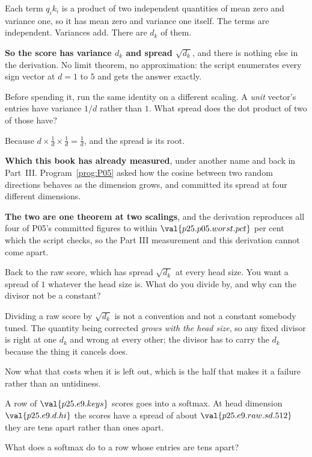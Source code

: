 \begin{fr}

Each term $q_i k_i$ is a product of two independent quantities of mean zero
and variance one, so it has mean zero and variance one itself. The terms are
independent. Variances add. There are $d_k$ of them.

\textbf{So the score has variance $d_k$ and spread $\sqrt{d_k}$}, and there is
nothing else in the derivation. No limit theorem, no approximation: the script
enumerates every sign vector at $d = 1$ to $5$ and gets the answer exactly.

Before spending it, run the same identity on a different scaling. A
\emph{unit} vector's entries have variance $1/d$ rather than $1$. What spread
does the dot product of two of those have?
\dotline
\nextframe
\end{fr}

\begin{fr}

Because $d \times \frac{1}{d} \times \frac{1}{d} = \frac{1}{d}$, and the
spread is its root.

\textbf{Which this book has already measured}, under another name and back in
Part~III. Program~\ref{prog:P05} asked how the cosine between two random
directions behaves as the dimension grows, and committed its spread at four
different dimensions.

\textbf{The two are one theorem at two scalings}, and the derivation
reproduces all four of P05's committed figures to within
$\val{p25.p05.worst.pct}$ per cent \dash{} which the script checks, so the
Part III measurement and this derivation cannot come apart.

Back to the raw score, which has spread $\sqrt{d_k}$ at every head size. You
want a spread of $1$ whatever the head size is. What do you divide by, and why
can the divisor not be a constant?
\dotline
\nextframe
\end{fr}

\begin{fr}

Dividing a raw score by $\sqrt{d_k}$ is not a convention and not a constant
somebody tuned. The quantity being corrected \emph{grows with the head size},
so any fixed divisor is right at one $d_k$ and wrong at every other; the
divisor has to carry the $d_k$ because the thing it cancels does.
\end{fr}

\begin{fr}
Now what that costs when it is left out, which is the half that makes it a
failure rather than an untidiness.

A row of $\val{p25.e9.keys}$ scores goes into a softmax. At head dimension
$\val{p25.e9.d.hi}$ the scores have a spread of about
$\val{p25.e9.raw.sd.512}$ \dash{} they are tens apart rather than ones apart.

What does a softmax do to a row whose entries are tens apart?
\dotline
\nextframe
\end{fr}

